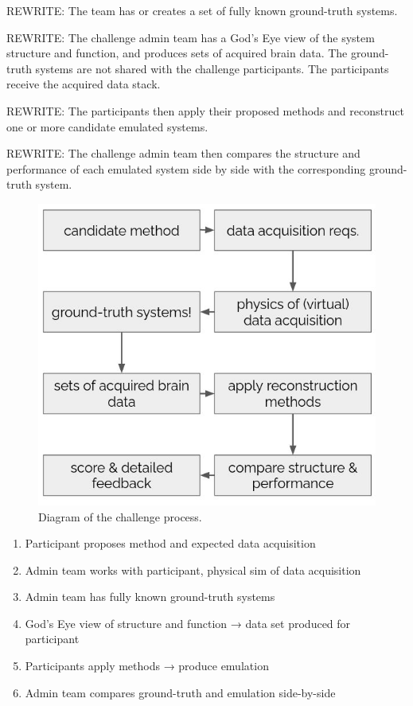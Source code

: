 \documentclass{ldr-article}
\begin{document}
\alert{REWRITE:} The team has or creates a set of fully known ground-truth systems.

\alert{REWRITE:} The challenge admin team has a God’s Eye view of the system structure and function, and produces sets of acquired brain data. The ground-truth systems are not shared with the challenge participants. The participants receive the acquired data stack.

\alert{REWRITE:} The participants then apply their proposed methods and reconstruct one or more candidate emulated systems.

\alert{REWRITE:} The challenge admin team then compares the structure and performance of each emulated system side by side with the corresponding ground-truth system.

\begin{figure}
	\centering
	\includegraphics[width=1\linewidth]{figures/challenge-process.jpg}
	\caption{Diagram of the challenge process.}
	\label{fig:challenge-process}
\end{figure}

\begin{enumerate}
	\item Participant proposes method and expected data acquisition
	\item Admin team works with participant, physical sim of data acquisition
	\item Admin team has fully known ground-truth systems
	\item God’s Eye view of structure and function → data set produced for participant
	\item Participants apply methods → produce emulation
	\item Admin team compares ground-truth and emulation side-by-side
\end{enumerate}
\end{document}
